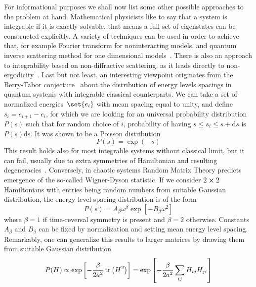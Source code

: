 For informational purposes we shall now list some other possible approaches to the problem at
hand. Mathematical physicists like to say that a system is integrable if it is exactly
solvable, that means a full set of eigenstates can be constructed explicitly. A variety
of techniques can be used in order to achieve that, for example Fourier transform for
noninteracting models, and quantum inverse scattering method for one dimensional 
models~\autocite{Faddeev1996,Korepin1993,Ilievski2014}. There is also an approach
to integrability based on non-diffractive scattering, as it leads directly 
to non-ergodicity~\autocite{Sutherland2004}. Last but not least, an interesting
viewpoint originates from the Berry-Tabor conjecture~\autocite{Berry1977} about the
distribution of energy levels spacings in quantum systems with integrable classical counterparts.
We can take a set of normalized energies~\(\set{e_i}\) with mean spacing equal to unity,
and define \(s_i = e_{i+1}-e_i\), for which we are looking for an universal probability
distribution \(P(s)\) such that for random choice of \(i\), probability of having
\(s \leq s_i \leq s+\mathrm{d}s\) is \(P(s)\mathrm{ds}\). It was shown to be a Poisson
distribution~\autocite{Ott2002}
\begin{equation}
    P(s) = \exp(-s)
\end{equation}
This result holds also for most integrable systems without classical limit, but it can fail,
usually due to extra symmetries of Hamiltonian and resulting degeneracies~\autocite{DAlessio2016}.
Conversely, in chaotic systems Random Matrix Theory predicts emergence of the so-called Wigner-Dyson
statistic. If we consider \(2\cross 2\) Hamiltonians with entries being random numbers from suitable
Gaussian distribution, the energy level spacing distribution is of the form~\autocite{DAlessio2016}
\begin{equation}
    P(s) = A_{\beta} \omega^{\beta} \exp\left[-B_{\beta} \omega^2\right]
\end{equation}
where \(\beta = 1\) if time-reversal symmetry is present and \(\beta = 2\) otherwise.
Constants \(A_{\beta}\) and \(B_{\beta}\) can be fixed by normalization and setting mean energy level
spacing. Remarkably, one can generalize this results to larger matrices by drawing
them from suitable Gaussian distribution~\autocite{Alhassid2000}
\begin{equation}
    P(H) \propto \exp\left[-\frac{\beta}{2a^2}\tr\left(H^2\right)\right] =
    \exp\left[-\frac{\beta}{2a^2}\sum_{ij} H_{ij}H_{ji}\right]
    \label{eq:GOE}
\end{equation}
